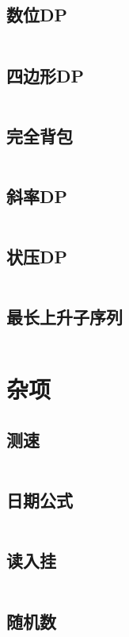 \documentclass[UTF8]{ctexart}
\begin{document}
\subsection{数位DP}
\inputminted{cpp}{dp/数位dp.cpp}

\subsection{四边形DP}
\inputminted{cpp}{dp/四边形dp.cpp}

\subsection{完全背包}
\inputminted{cpp}{dp/完全背包.cpp}

\subsection{斜率DP}
\inputminted{cpp}{dp/斜率dp.cpp}

\subsection{状压DP}
\inputminted{cpp}{dp/状压dp.cpp}

\subsection{最长上升子序列}
\inputminted{cpp}{dp/最长上升子序列.cpp}

\section{杂项}

\subsection{测速}
\inputminted{cpp}{others/chrono.cpp}

\subsection{日期公式}
\inputminted{cpp}{others/date.cpp}

\subsection{读入挂}
\inputminted{cpp}{others/fread.cpp}

\subsection{随机数}
\inputminted{cpp}{others/随机数.cpp}
\end{document}
